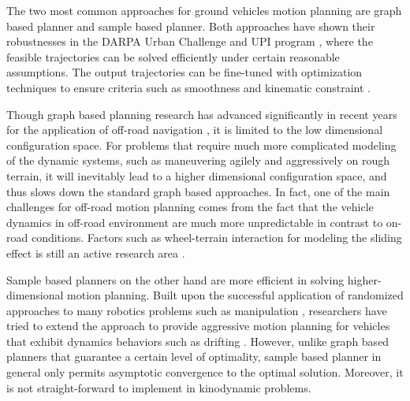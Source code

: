 \documentclass[../thesis.tex]{subfiles}
\begin{document}

The two most common approaches for ground vehicles motion planning are graph based planner and sample based planner. 
Both approaches have shown their robustnesses in the DARPA Urban Challenge \cite{koenig2002d,kuwata2008motion} and UPI program \cite{kelly2006toward,stentz2007crusher}, where the feasible trajectories can be solved efficiently under certain reasonable assumptions. The output trajectories can be fine-tuned with optimization techniques to ensure criteria such as smoothness and kinematic constraint \cite{dolgov2008practical}.


Though graph based planning research has advanced significantly in recent years for the application of off-road navigation \cite{kelly2006toward,stentz2007crusher}, it is limited to the low dimensional configuration space.
For problems that require much more complicated modeling of the dynamic systems, such as maneuvering agilely and aggressively on rough terrain, it will inevitably lead to a higher dimensional configuration space, and thus slows down the standard graph based approaches. 
In fact, one of the main challenges for off-road motion planning comes from the fact that the vehicle dynamics in off-road environment are much more unpredictable in contrast to on-road conditions. 
Factors such as wheel-terrain interaction for modeling the sliding effect is still an active research area \cite{shibly2005equivalent,rubinstein2004detailed}. 


Sample based planners on the other hand are more efficient in solving higher-dimensional motion planning. 
Built upon the successful application of randomized approaches to many robotics problems such as manipulation \cite{kuffner2000rrt}, researchers have tried to extend the approach to provide aggressive motion planning for vehicles that exhibit dynamics behaviors such as drifting  \cite{hwan2011anytime}. However, unlike graph based planners that guarantee a certain level of optimality, sample based planner in general only permits asymptotic convergence to the optimal solution. Moreover, it is not straight-forward to implement in kinodynamic problems.
\end{document}
